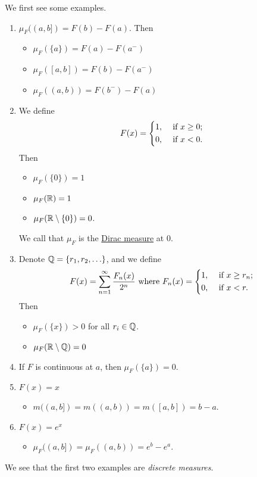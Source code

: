 \begin{eg}
	We first see some examples.
	\begin{enumerate}
		\item \(\mu _F((a, b]) = F(b) - F(a)\). Then
		      \begin{itemize}
			      \item \(\mu _F(\{a\}) = F(a) - F(a^-)\)
			      \item \(\mu _F([a, b]) = F(b) - F(a^-)\)
			      \item \(\mu _F((a, b)) = F(b^-) - F(a)\)
		      \end{itemize}
		\item We define
		      \[
			      F(x) = \begin{dcases}
				      1, & \text{ if } x\geq 0 ; \\
				      0, & \text{ if } x<0.
			      \end{dcases}
		      \]
		      Then
		      \begin{itemize}
			      \item \(\mu _F(\{0\})=1\)
			      \item \(\mu _F(\mathbb{\MakeUppercase{r}} ) = 1\)
			      \item \(\mu _F(\mathbb{\MakeUppercase{r}}\setminus \{0\} ) = 0\).
		      \end{itemize}
		      We call that \(\mu _F\) is the \underline{Dirac measure} at \(0\).
		\item Denote \(\mathbb{\MakeUppercase{q}} = \{r_1, r_2, \ldots  \}\), and we define
		      \[
			      F(x) = \sum\limits_{n=1}^{\infty} \frac{F_n(x)}{2^n} \text{ where }  F_{n}(x) = \begin{dcases}
				      1, & \text{ if } x\geq r_n; \\
				      0, & \text{ if } x<r.       \\
			      \end{dcases}
		      \]
		      Then
		      \begin{itemize}
			      \item \(\mu _F(\{x\})>0\) for all \(r_{i}\in\mathbb{\MakeUppercase{q}} \).
			      \item \(\mu _F(\mathbb{\MakeUppercase{r}} \setminus \mathbb{\MakeUppercase{q}} ) = 0\)
		      \end{itemize}
		\item If \(F\) is continuous at \(a\), then \(\mu _F(\{a\}) = 0\).
		\item \(F(x) = x\)
		      \begin{itemize}
			      \item \( m((a, b]) = m((a, b)) = m([a, b]) = b - a\).
		      \end{itemize}
		\item \(F(x) = e^x\)
		      \begin{itemize}
			      \item \(\mu _F((a, b]) = \mu _F((a, b)) = e^b - e^a\).
		      \end{itemize}
	\end{enumerate}
	\begin{remark}
		We see that the first two examples are \emph{discrete measures}.
	\end{remark}
\end{eg}

